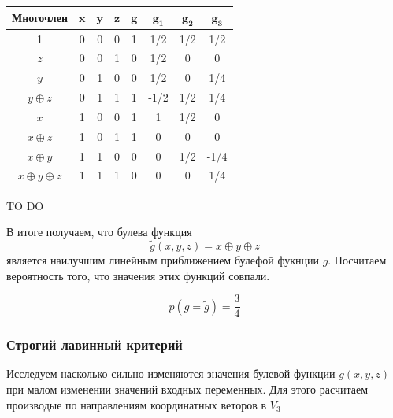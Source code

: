 \documentclass[a4paper,12pt]{article}
\theoremstyle{definition}
\begin{document}
	\begin{table}[h!]
		\begin{center}
			\begin{tabular}{|c|c|c|c||c||c|c|c|}
				\hline
				\textbf{Многочлен} & $ \pmb{x} $ & $ \pmb{y} $ & $ \pmb{z} $ & $ \pmb{g} $ & $ \pmb{g_1} $ & $ \pmb{g_2} $ & $ \pmb{g_3} $ \\ \hline
					1 & 0 & 0 & 0 & 1 &  1/2 &  1/2 &  1/2 \\ \hline
				  $z$ & 0 & 0 & 1 & 0 &  1/2 &    0 &    0 \\ \hline
			   	  $y$ & 0 & 1 & 0 & 0 &  1/2 &    0 &  1/4 \\ \hline
		 $y \oplus z$ & 0 & 1 & 1 & 1 & -1/2 &  1/2 &  1/4 \\ \hline
				  $x$ & 1 & 0 & 0 & 1 &    1 &  1/2 &    0 \\ \hline
		 $x \oplus z$ & 1 & 0 & 1 & 1 &    0 &    0 &    0 \\ \hline
		 $x \oplus y$ & 1 & 1 & 0 & 0 &    0 &  1/2 & -1/4 \\ \hline
$x \oplus y \oplus z$ & 1 & 1 & 1 & 0 &    0 &    0 &  1/4 \\ \hline
			\end{tabular}
		\end{center}
	\end{table}

	TO DO

	В итоге получаем, что булева функция	
	\[ \tilde{g}(x,y,z) = x \oplus y \oplus z \]
	является наилучшим линейным приближением булефой фукнции $g$. Посчитаем вероятность того, что значения этих функций совпали.
	
	\[ p(g=\tilde{g}) = \frac{3}{4} \]
	
	\subsubsection{Строгий лавинный критерий}
	
	Исследуем насколько сильно изменяются значения булевой функции $g(x, y, z)$ при малом изменении значений входных переменных. Для этого расчитаем производые по направлениям координатных веторов в $V_3$
	
\end{document}
